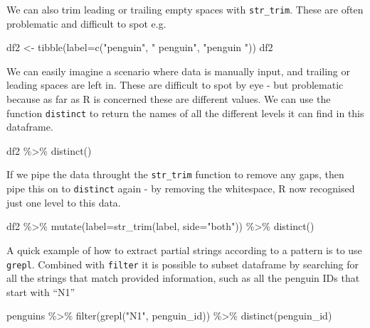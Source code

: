 \documentclass[
]{book}
\newenvironment{Shaded}{\begin{snugshade}}{\end{snugshade}}
\newcommand{\AttributeTok}[1]{\textcolor[rgb]{0.77,0.63,0.00}{#1}}
\newcommand{\FunctionTok}[1]{\textcolor[rgb]{0.00,0.00,0.00}{#1}}
\newcommand{\NormalTok}[1]{#1}
\newcommand{\OtherTok}[1]{\textcolor[rgb]{0.56,0.35,0.01}{#1}}
\newcommand{\SpecialCharTok}[1]{\textcolor[rgb]{0.00,0.00,0.00}{#1}}
\newcommand{\StringTok}[1]{\textcolor[rgb]{0.31,0.60,0.02}{#1}}
\begin{document}
We can also trim leading or trailing empty spaces with \texttt{str\_trim}. These are often problematic and difficult to spot e.g.

\begin{Shaded}
\begin{Highlighting}[]
\NormalTok{df2 }\OtherTok{\textless{}{-}} \FunctionTok{tibble}\NormalTok{(}\AttributeTok{label=}\FunctionTok{c}\NormalTok{(}\StringTok{"penguin"}\NormalTok{, }\StringTok{" penguin"}\NormalTok{, }\StringTok{"penguin "}\NormalTok{)) }
\NormalTok{df2}
\end{Highlighting}
\end{Shaded}

We can easily imagine a scenario where data is manually input, and trailing or leading spaces are left in. These are difficult to spot by eye - but problematic because as far as R is concerned these are different values. We can use the function \texttt{distinct} to return the names of all the different levels it can find in this dataframe.

\begin{Shaded}
\begin{Highlighting}[]
\NormalTok{df2 }\SpecialCharTok{\%\textgreater{}\%} 
  \FunctionTok{distinct}\NormalTok{()}
\end{Highlighting}
\end{Shaded}

If we pipe the data throught the \texttt{str\_trim} function to remove any gaps, then pipe this on to \texttt{distinct} again - by removing the whitespace, R now recognised just one level to this data.

\begin{Shaded}
\begin{Highlighting}[]
\NormalTok{df2 }\SpecialCharTok{\%\textgreater{}\%} 
  \FunctionTok{mutate}\NormalTok{(}\AttributeTok{label=}\FunctionTok{str\_trim}\NormalTok{(label, }\AttributeTok{side=}\StringTok{"both"}\NormalTok{)) }\SpecialCharTok{\%\textgreater{}\%} 
  \FunctionTok{distinct}\NormalTok{()}
\end{Highlighting}
\end{Shaded}

A quick example of how to extract partial strings according to a pattern is to use \texttt{grepl}. Combined with \texttt{filter} it is possible to subset dataframe by searching for all the strings that match provided information, such as all the penguin IDs that start with ``N1''

\begin{Shaded}
\begin{Highlighting}[]
\NormalTok{penguins }\SpecialCharTok{\%\textgreater{}\%} 
  \FunctionTok{filter}\NormalTok{(}\FunctionTok{grepl}\NormalTok{(}\StringTok{"N1"}\NormalTok{, penguin\_id)) }\SpecialCharTok{\%\textgreater{}\%} 
  \FunctionTok{distinct}\NormalTok{(penguin\_id)}
\end{Highlighting}
\end{Shaded}
\end{document}

